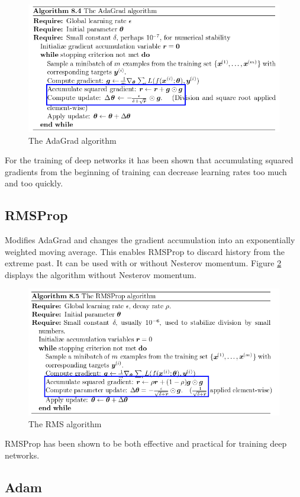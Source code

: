 \documentclass[]{article}
\begin{document}
\begin{figure}[h!]
	\centering
	\includegraphics[width=0.8\linewidth]{ada_grad}
	\caption{The AdaGrad algorithm}
	\label{fig:adagrad}
\end{figure}

\noindent For the training of deep networks it has been shown that accumulating squared gradients from the beginning of training can decrease learning rates too much and too quickly. 


\subsection{RMSProp}

Modifies AdaGrad and changes the gradient accumulation into an exponentially weighted moving average. This enables RMSProp to discard history from the extreme past. It can be used with or without Nesterov momentum. Figure \ref{fig:rms_prop} displays the algorithm without Nesterov momentum.

\begin{figure}[h!]
	\centering
	\includegraphics[width=0.8\linewidth]{rms_prop}
	\caption{The RMS algorithm}
	\label{fig:rms_prop}
\end{figure}

\noindent RMSProp has been shown to be both effective and practical for training deep networks.

\subsection{Adam}
\end{document}
